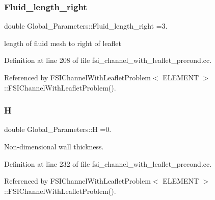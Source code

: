 \mbox{\label{namespaceGlobal__Parameters_a0a2d2dfd5a51de4b4fcd3937c029010f}} 
\subsubsection{\texorpdfstring{Fluid\+\_\+length\+\_\+right}{Fluid\_length\_right}}
{\footnotesize\ttfamily double Global\+\_\+\+Parameters\+::\+Fluid\+\_\+length\+\_\+right =3.}



length of fluid mesh to right of leaflet 



Definition at line 208 of file fsi\+\_\+channel\+\_\+with\+\_\+leaflet\+\_\+precond.\+cc.



Referenced by F\+S\+I\+Channel\+With\+Leaflet\+Problem$<$ E\+L\+E\+M\+E\+N\+T $>$\+::\+F\+S\+I\+Channel\+With\+Leaflet\+Problem().

\mbox{\label{namespaceGlobal__Parameters_ab360628e7830e43e355ce5768f6d6a6c}} 
\subsubsection{\texorpdfstring{H}{H}}
{\footnotesize\ttfamily double Global\+\_\+\+Parameters\+::H =0.}



Non-\/dimensional wall thickness. 



Definition at line 232 of file fsi\+\_\+channel\+\_\+with\+\_\+leaflet\+\_\+precond.\+cc.



Referenced by F\+S\+I\+Channel\+With\+Leaflet\+Problem$<$ E\+L\+E\+M\+E\+N\+T $>$\+::\+F\+S\+I\+Channel\+With\+Leaflet\+Problem().

\mbox{\label{namespaceGlobal__Parameters_a3e3428638f89f970fcf2148b0bab1465}} 
